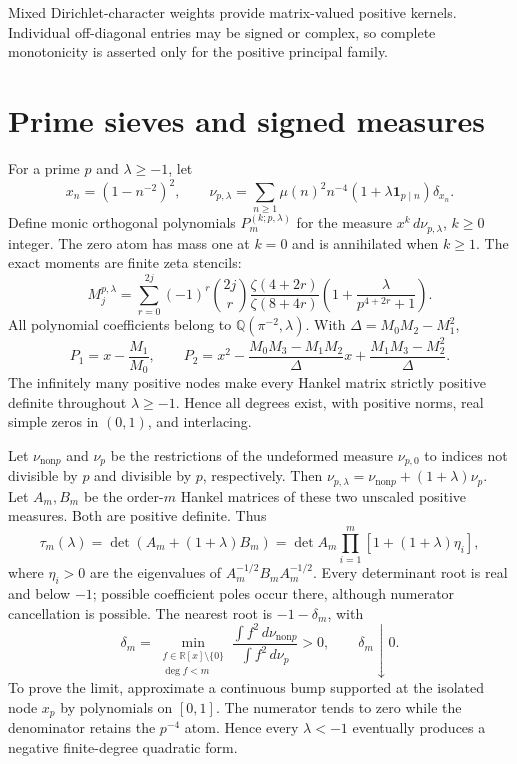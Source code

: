 \documentclass[11pt,oneside,openany]{book}
\newcommand{\dd}{\,d}
\begin{document}
Mixed Dirichlet-character weights provide matrix-valued positive kernels.
Individual off-diagonal entries may be signed or complex, so complete
monotonicity is asserted only for the positive principal family.



\chapter{Prime sieves and signed measures}\label{ch:sieves}
For a prime $p$ and $\lambda\ge-1$, let
\[
x_n=(1-n^{-2})^2,\qquad
\nu_{p,\lambda}=\sum_{n\ge1}\mu(n)^2n^{-4}
(1+\lambda\mathbf1_{p\mid n})\delta_{x_n}.
\]
Define monic orthogonal polynomials $P_m^{(k;p,\lambda)}$ for the measure
$x^k\dd\nu_{p,\lambda}$, $k\ge0$ integer. The zero atom has mass one at
$k=0$ and is annihilated when $k\ge1$.
The exact moments are finite zeta stencils:
\[
M_j^{p,\lambda}=\sum_{r=0}^{2j}(-1)^r\binom{2j}{r}
\frac{\zeta(4+2r)}{\zeta(8+4r)}
\left(1+\frac{\lambda}{p^{4+2r}+1}\right).
\]
All polynomial coefficients belong to $\mathbb Q(\pi^{-2},\lambda)$.
With $\Delta=M_0M_2-M_1^2$,
\[
P_1=x-\frac{M_1}{M_0},\qquad
P_2=x^2-\frac{M_0M_3-M_1M_2}{\Delta}x+
\frac{M_1M_3-M_2^2}{\Delta}.
\]
The infinitely many positive nodes make every Hankel matrix strictly positive
definite throughout $\lambda\ge-1$. Hence all degrees exist, with positive
norms, real simple zeros in $(0,1)$, and interlacing.

Let $\nu_{\mathrm{non}p}$ and $\nu_p$ be the restrictions of the
undeformed measure $\nu_{p,0}$ to indices not divisible by $p$ and divisible
by $p$, respectively. Then
$\nu_{p,\lambda}=\nu_{\mathrm{non}p}+(1+\lambda)\nu_p$.
Let $A_m,B_m$ be the order-$m$ Hankel matrices of these two unscaled
positive measures. Both are positive definite.
Thus
\[
\tau_m(\lambda)=\det(A_m+(1+\lambda)B_m)
=\det A_m\prod_{i=1}^{m}[1+(1+\lambda)\eta_i],
\]
where $\eta_i>0$ are the eigenvalues of $A_m^{-1/2}B_mA_m^{-1/2}$.
Every determinant root is real and below $-1$; possible coefficient poles
occur there, although numerator cancellation is possible.
The nearest root is $-1-\delta_m$, with
\[
\delta_m=\min_{\substack{f\in\mathbb R[x]\setminus\{0\}\\\deg f<m}}
\frac{\int f^2\dd\nu_{\mathrm{non}p}}{\int f^2\dd\nu_p}>0,
\qquad\delta_m\downarrow0.
\]
To prove the limit, approximate a continuous bump supported at the isolated
node $x_p$ by polynomials on $[0,1]$. The numerator tends to zero while the
denominator retains the $p^{-4}$ atom. Hence every $\lambda<-1$ eventually
produces a negative finite-degree quadratic form.
\end{document}
